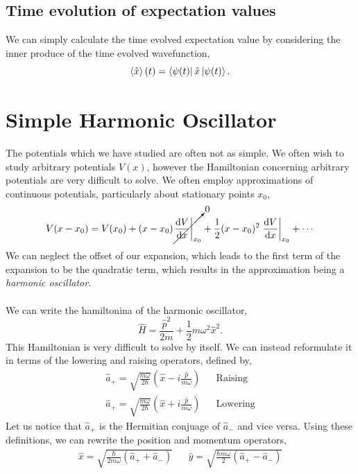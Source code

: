 \documentclass{book}
\begin{document}
\subsection{Time evolution of expectation values}
We can simply calculate the time evolved expectation value by considering the inner produce of the time evolved wavefunction,
\begin{equation}
	\left<\hat{x}\right>(t) = \bra{\psi(t)}\hat{x}\ket{\psi(t)}.
\end{equation}
\section{Simple Harmonic Oscillator}
The potentials which we have studied are often not as simple. We often wish to study arbitrary potentials $V(x)$, however the Hamiltonian concerning arbitrary potentials are very difficult to solve. We often employ approximations of continuous potentials, particularly about stationary points $x_0$,
\begin{equation}
	V(x - x_0) = V(x_0) + (x-x_0)\cancelto{0}{\eval{\dv{V}{x}}_{x_0}} + \frac{1}{2}(x-x_0)^2\eval{\dv{V}{x}}_{x_0} + \cdots
\end{equation}
We can neglect the offset of our expansion, which leads to the first term of the expansion to be the quadratic term, which results in the approximation being a \textit{harmonic oscillator}.
\\\\
We can write the hamiltonina of the harmonic oscillator,
\begin{equation}
	\hat{H} = \frac{\hat{p}^2}{2m} + \frac{1}{2}m\omega^2\hat{x}^2.
\end{equation}
This Hamiltonian is very difficult to solve by itself. We can instead reformulate it in terms of the lowering and raising operators, defined by,
\begin{align}
	\hat{a}_+ = \sqrt{\frac{m\omega}{2\hbar}}\left(\hat{x} - i \frac{\hat{p}}{m\omega}\right) && \text{Raising} \\
	\hat{a}_+ = \sqrt{\frac{m\omega}{2\hbar}}\left(\hat{x} + i \frac{\hat{p}}{m\omega}\right) && \text{Lowering}
\end{align}
Let us notice that $\hat{a}_+$ is the Hermitian conjuage of $\hat{a}_-$ and vice versa. Using these definitions, we can rewrite the position and momentum operators,
\begin{align}
	\hat{x} = \sqrt{\frac{\hbar}{2m\omega}\left(\hat{a}_+ + \hat{a}_-\right)} && \hat{y} = \sqrt{\frac{\hbar m\omega}{2}\left(\hat{a}_+ - \hat{a}_-\right)}
\end{align}
\end{document}
